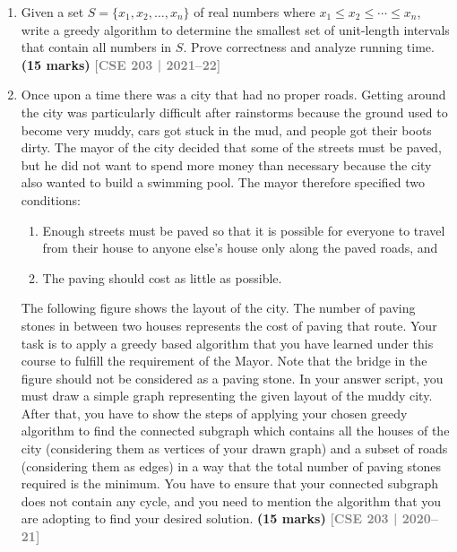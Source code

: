 \documentclass[12pt,a3paper]{article}
\newcommand{\yr}[1]{\hfill\textcolor{gray}{\small\textbf{[#1]}}}
\newcommand{\mk}[1]{\textcolor{orange!70!black}{\small\textbf{(#1 marks)}}}
\begin{document}
\begin{enumerate}
\item Given a set $S = \{x_1, x_2, \ldots, x_n\}$ of real numbers where $x_1 \leq x_2 \leq \cdots \leq x_n$, write a greedy algorithm to determine the smallest set of unit-length intervals that contain all numbers in $S$. Prove correctness and analyze running time. \mk{15}
\yr{CSE 203 | 2021--22}

\item Once upon a time there was a city that had no proper roads. Getting around
the city was particularly difficult after rainstorms because the ground used to
become very muddy, cars got stuck in the mud, and people got their boots dirty.
The mayor of the city decided that some of the streets must be paved, but he did
not want to spend more money than necessary because the city also wanted to build
a swimming pool. The mayor therefore specified two conditions:
\begin{enumerate}[label=(\roman*)]
  \item Enough streets must be paved so that it is possible for everyone to
  travel from their house to anyone else's house only along the paved roads, and
  \item The paving should cost as little as possible.
\end{enumerate}
The following figure shows the layout of the city. The number of paving stones
in between two houses represents the cost of paving that route. Your task is to
apply a greedy based algorithm that you have learned under this course to fulfill
the requirement of the Mayor. Note that the bridge in the figure should not be
considered as a paving stone. In your answer script, you must draw a simple
graph representing the given layout of the muddy city. After that, you have to
show the steps of applying your chosen greedy algorithm to find the connected
subgraph which contains all the houses of the city (considering them as vertices
of your drawn graph) and a subset of roads (considering them as edges) in a way
that the total number of paving stones required is the minimum. You have to
ensure that your connected subgraph does not contain any cycle, and you need to
mention the algorithm that you are adopting to find your desired solution.
\mk{15}
\yr{CSE 203 | 2020--21}


\end{enumerate}
\end{document}

